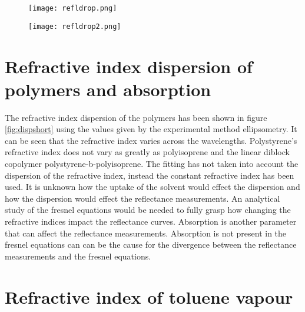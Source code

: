 \documentclass[MasterThesisMain.tex]{subfiles}
\begin{document}
\begin{figure}[H]
\centering
\texttt{[image: refldrop.png]}
\caption{}
\label{fig:drop}
\end{figure}

\begin{figure}[H]
\centering
\texttt{[image: refldrop2.png]}
\caption{}
\label{fig:drop2}
\end{figure}

\section{Refractive index dispersion of polymers and absorption}
The refractive index dispersion of the polymers has been shown in figure \ref{fig:dispshort} using the values given by the experimental method ellipsometry. It can be seen that the refractive index varies across the wavelengths. Polystyrene's refractive index does not vary as greatly as polyisoprene and the linear diblock copolymer polystyrene-b-polyisoprene. The fitting has not taken into account the dispersion of the refractive index, instead the constant refractive index has been used. It is unknown how the uptake of the solvent would effect the dispersion and how the dispersion would effect the reflectance measurements. An analytical study of the fresnel equations would be needed to fully grasp how changing the refractive indices impact the reflectance curves. Absorption is another parameter that can affect the reflectance measurements. Absorption is not present in the fresnel equations can can be the cause for the divergence between the reflectance measurements and the fresnel equations. 

\section{Refractive index of toluene vapour}   
\end{document}
